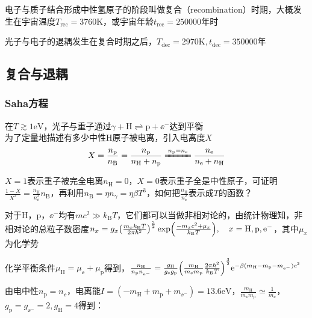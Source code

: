 \par 
电子与质子结合形成中性氢原子的阶段叫做复合（recombination）时期，大概发生在宇宙温度$T_{\text{rec}} = 3760 \mathrm{K}$，或宇宙年龄$t_{\text{rec}} = 250000 \text{年}$时
\par 
光子与电子的退耦发生在复合时期之后，$T_{\text{dec}} = 2970 \mathrm{K}, t_{\text{dec}} = 350000 \text{年}$

\subsection{复合与退耦}
\subsubsection{Saha方程}
\par 
在$T \gtrsim 1 \mathrm{eV}$，光子与重子通过$\gamma + \mathrm{H} \rightleftharpoons \mathrm{p} + \ee^{-}$达到平衡 \\
为了定量地描述有多少中性H原子被电离，引入电离度$X$
\begin{equation}
	X = \frac{n_{\text{p}}}{n_{\text{B}}} = \frac{n_{\text{p}}}{n_{\text{H}} + n_{\text{p}}} \xlongequal[]{n_{\text{p}} = n_{\ee}} \frac{n_{\ee}}{n_{\ee} + n_{\text{H}}}
\end{equation}
\par 
$X = 1$表示重子被完全电离$n_{\text{H}} = 0$，$X = 0$表示重子全是中性原子，可证明$\frac{1 - X}{X^2} = \frac{n_{\text{H}}}{n_{\ee}^2} n_{\text{B}}$，再利用$n_{\text{B}} = \eta n_{\gamma} = \eta \beta T^{3}$，如何把$\frac{n_{\text{H}}}{n_{\ee}^2}$表示成$T$的函数？
\par 
对于H，p，$\ee^{-}$均有$m c^2 \gg k_{\text{B}} T$，它们都可以当做非相对论的，由统计物理知，非相对论的总粒子数密度$n_{x} = g_x \qty(\frac{m_x k_{\text{B}} T}{2 \pi \hbar^2})^{\frac{3}{2}} \exp(\frac{-m_x c^2 + \mu_x}{k_{\text{B}} T}),\quad x = \text{H}, \text{p}, \mathrm{e}^{-}$，其中$\mu_x$为化学势
\par 
化学平衡条件$\mu_{\text{H}} = \mu_{\ee} + \mu_{\text{p}}$得到，$\frac{n_{\text{H}}}{n_{\text{p}} n_{\mathrm{e}^{-}}} = \frac{g_{\text{H}}}{g_{\mathrm{e}} g_{\text{p}}} \qty(\frac{m_{\text{H}}}{m_{\mathrm{e}} m_{\text{p}}} \frac{2 \pi \hbar^2}{k_{\text{B}} T})^{\frac{3}{2}} \mathrm{e}^{-\beta (m_{\text{H}} -m_{\text{p}} - m_{\mathrm{e}^{-}}) c^2}$
\par 
由电中性$n_{\text{p}} = n_{\ee}$，电离能$I = (-m_{\text{H}} +m_{\text{p}} + m_{\ee^{-}}) = 13.6\mathrm{eV}$，$\frac{m_{\text{H}}}{m_{\ee} m_{\text{p}}} \simeq \frac{1}{m_{\ee}}$，$g_{\text{p}} = g_{\ee^-} = 2, g_{\text{H}} = 4$得到：

